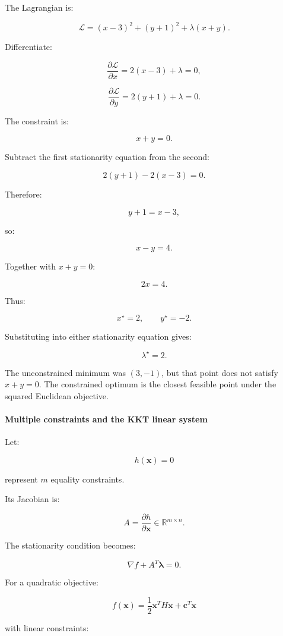 The Lagrangian is:

\[
\mathcal L= (x-3)^2+(y+1)^2+\lambda(x+y).
\]

Differentiate:

\[
\frac{\partial\mathcal L}{\partial x} = 2(x-3)+\lambda=0,
\]

\[
\frac{\partial\mathcal L}{\partial y} = 2(y+1)+\lambda=0.
\]

The constraint is:

\[
x+y=0.
\]

Subtract the first stationarity equation from the second:

\[
2(y+1)-2(x-3)=0.
\]

Therefore:

\[
y+1=x-3,
\]

so:

\[
x-y=4.
\]

Together with \(x+y=0\):

\[
2x=4.
\]

Thus:

\[
\boxed{x^\star=2,\qquad y^\star=-2}.
\]

Substituting into either stationarity equation gives:

\[
\boxed{\lambda^\star=2}.
\]

The unconstrained minimum was \((3,-1)\), but that point does not satisfy \(x+y=0\). The constrained optimum is the closest feasible point under the squared Euclidean objective.

\paragraph{Multiple constraints and the KKT linear system}\label{02-foundations-ii-ch026-multiple-constraints-and-the-kkt-linear-system}

Let:

\[
h(\mathbf x)=0
\]

represent \(m\) equality constraints.

Its Jacobian is:

\[
A=\frac{\partial h}{\partial\mathbf x} \in\mathbb R^{m\times n}.
\]

The stationarity condition becomes:

\[
\nabla f+A^T\boldsymbol\lambda=0.
\]

For a quadratic objective:

\[
f(\mathbf x)=\frac12\mathbf x^TH\mathbf x+\mathbf c^T\mathbf x
\]

with linear constraints:

